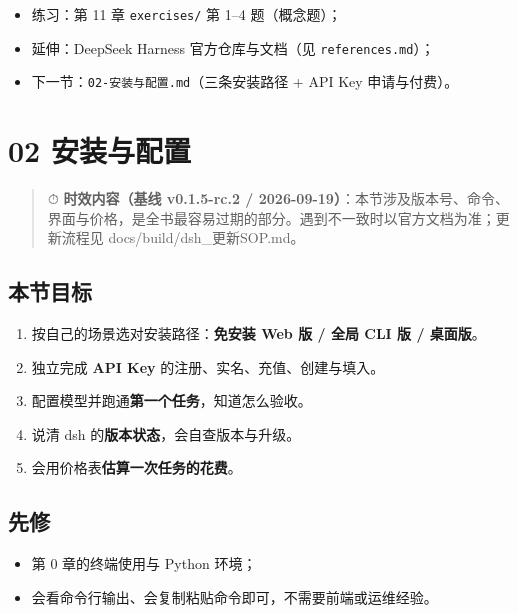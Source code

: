 \begin{itemize}
\tightlist
\item
  练习：第 11 章 \texttt{exercises/} 第 1--4 题（概念题）；
\item
  延伸：DeepSeek Harness 官方仓库与文档（见 \texttt{references.md}）；
\item
  下一节：\texttt{02-安装与配置.md}（三条安装路径 + API Key
  申请与付费）。
\end{itemize}

\section{02 安装与配置}\label{ux5b89ux88c5ux4e0eux914dux7f6e}

\begin{quote}
⏱ \textbf{时效内容（基线 v0.1.5-rc.2 /
2026-09-19）}：本节涉及版本号、命令、界面与价格，是全书最容易过期的部分。遇到不一致时以官方文档为准；更新流程见
docs/build/dsh\_更新SOP.md。
\end{quote}

\subsection{本节目标}\label{ux672cux8282ux76eeux6807-32}

\begin{enumerate}
\def\labelenumi{\arabic{enumi}.}
\tightlist
\item
  按自己的场景选对安装路径：\textbf{免安装 Web 版 / 全局 CLI 版 /
  桌面版}。
\item
  独立完成 \textbf{API Key} 的注册、实名、充值、创建与填入。
\item
  配置模型并跑通\textbf{第一个任务}，知道怎么验收。
\item
  说清 dsh 的\textbf{版本状态}，会自查版本与升级。
\item
  会用价格表\textbf{估算一次任务的花费}。
\end{enumerate}

\subsection{先修}\label{ux5148ux4fee-25}

\begin{itemize}
\tightlist
\item
  第 0 章的终端使用与 Python 环境；
\item
  会看命令行输出、会复制粘贴命令即可，不需要前端或运维经验。
\end{itemize}

